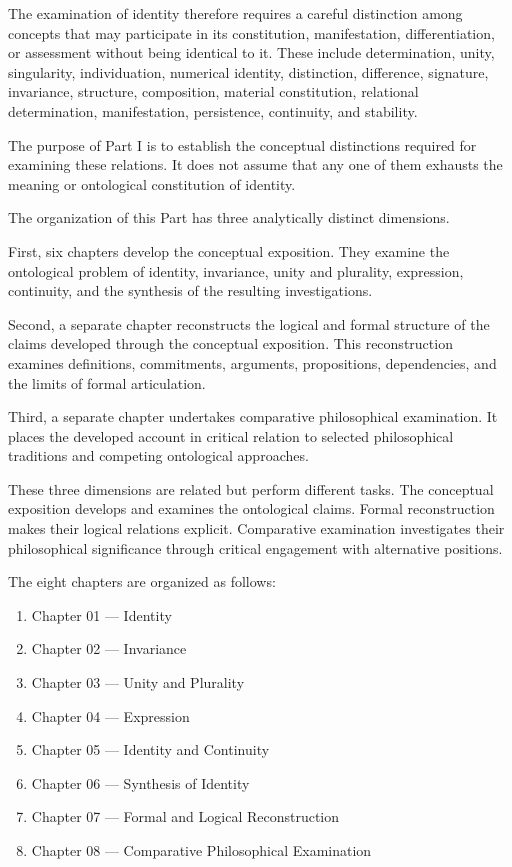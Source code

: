 The examination of identity therefore requires a careful
distinction among concepts that may participate in its
constitution, manifestation, differentiation, or assessment
without being identical to it. These include determination,
unity, singularity, individuation, numerical identity,
distinction, difference, signature, invariance, structure,
composition, material constitution, relational determination,
manifestation, persistence, continuity, and stability.

The purpose of Part I is to establish the conceptual
distinctions required for examining these relations. It
does not assume that any one of them exhausts the meaning
or ontological constitution of identity.

The organization of this Part has three analytically
distinct dimensions.

First, six chapters develop the conceptual exposition.
They examine the ontological problem of identity, invariance,
unity and plurality, expression, continuity, and the synthesis
of the resulting investigations.

Second, a separate chapter reconstructs the logical and
formal structure of the claims developed through the
conceptual exposition. This reconstruction examines
definitions, commitments, arguments, propositions,
dependencies, and the limits of formal articulation.

Third, a separate chapter undertakes comparative
philosophical examination. It places the developed
account in critical relation to selected philosophical
traditions and competing ontological approaches.

These three dimensions are related but perform different
tasks. The conceptual exposition develops and examines
the ontological claims. Formal reconstruction makes their
logical relations explicit. Comparative examination
investigates their philosophical significance through
critical engagement with alternative positions.

The eight chapters are organized as follows:

\begin{enumerate}
    \item Chapter 01 — Identity
    \item Chapter 02 — Invariance
    \item Chapter 03 — Unity and Plurality
    \item Chapter 04 — Expression
    \item Chapter 05 — Identity and Continuity
    \item Chapter 06 — Synthesis of Identity
    \item Chapter 07 — Formal and Logical Reconstruction
    \item Chapter 08 — Comparative Philosophical Examination
\end{enumerate}

